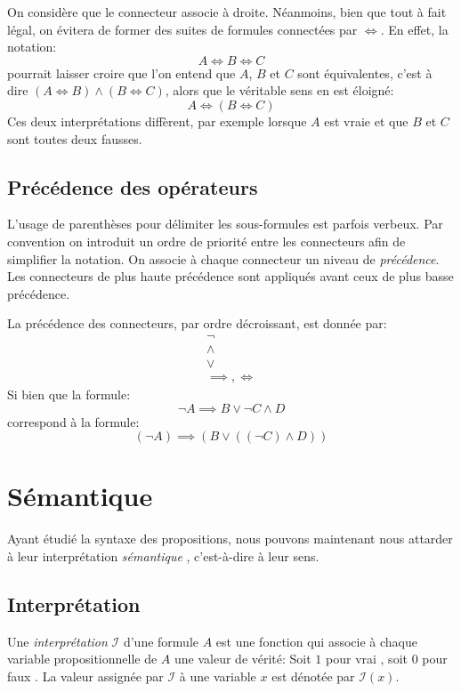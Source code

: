 On considère que le connecteur associe à droite.
Néanmoins, bien que tout à fait légal, on évitera de former des suites de formules connectées par ${\iff}$.
En effet, la notation:
\[
A \iff B \iff C
\]
pourrait laisser croire que l'on entend que $A$, $B$ et $C$ sont équivalentes, c'est à dire $(A \iff B) \wedge (B \iff C)$,
alors que le véritable sens en est éloigné:
\[
A \iff (B \iff C)
\] 
Ces deux interprétations diffèrent, par exemple lorsque $A$ est vraie et que $B$ et $C$ sont toutes deux fausses.

\subsection{Précédence des opérateurs}

L'usage de parenthèses pour délimiter les sous-formules est parfois verbeux.
Par convention on introduit un ordre de priorité entre les connecteurs afin de simplifier la notation.
On associe à chaque connecteur un niveau de \textit{précédence}. Les connecteurs de plus haute précédence sont appliqués avant ceux de plus basse précédence.

La précédence des connecteurs, par ordre décroissant, est donnée par:
\begin{gather*}
{\neg}\\
{\wedge}\\
{\vee}\\
{\implies}, {\iff}
\end{gather*}
Si bien que la formule:
\[
\neg A \implies B \vee \neg C \wedge D
\]
correspond à la formule:
\[
(\neg A) \implies (B \vee ((\neg C) \wedge D))
\]

\section{Sémantique}

Ayant étudié la syntaxe des propositions, nous pouvons maintenant nous attarder à leur interprétation \og \textit{sémantique} \fg{}, c'est-à-dire à leur sens.

\subsection{Interprétation}

Une \textit{interprétation} $\mathcal{I}$ d'une formule $A$ est une fonction qui associe à chaque variable propositionnelle de $A$ une valeur de vérité: Soit $1$ pour \og vrai \fg, soit $0$ pour \og faux \fg.
La valeur assignée par $\mathcal{I}$ à une variable $x$ est dénotée par $\mathcal{I}(x)$.

